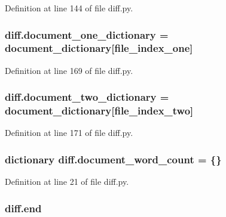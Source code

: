 Definition at line 144 of file diff.\+py.

\subsubsection[{\texorpdfstring{document\+\_\+one\+\_\+dictionary}{document_one_dictionary}}]{\setlength{\rightskip}{0pt plus 5cm}diff.\+document\+\_\+one\+\_\+dictionary = {\bf document\+\_\+dictionary}\mbox{[}{\bf file\+\_\+index\+\_\+one}\mbox{]}}\hypertarget{namespacediff_aa4da046a613de2dafe03d105bca31694}{}\label{namespacediff_aa4da046a613de2dafe03d105bca31694}


Definition at line 169 of file diff.\+py.

\subsubsection[{\texorpdfstring{document\+\_\+two\+\_\+dictionary}{document_two_dictionary}}]{\setlength{\rightskip}{0pt plus 5cm}diff.\+document\+\_\+two\+\_\+dictionary = {\bf document\+\_\+dictionary}\mbox{[}file\+\_\+index\+\_\+two\mbox{]}}\hypertarget{namespacediff_a00ac707250a54a82a970c2bb2acf736a}{}\label{namespacediff_a00ac707250a54a82a970c2bb2acf736a}


Definition at line 171 of file diff.\+py.

\subsubsection[{\texorpdfstring{document\+\_\+word\+\_\+count}{document_word_count}}]{\setlength{\rightskip}{0pt plus 5cm}dictionary diff.\+document\+\_\+word\+\_\+count = \{\}}\hypertarget{namespacediff_af16edaaafe4787892cb925870fd0d108}{}\label{namespacediff_af16edaaafe4787892cb925870fd0d108}


Definition at line 21 of file diff.\+py.

\subsubsection[{\texorpdfstring{end}{end}}]{\setlength{\rightskip}{0pt plus 5cm}diff.\+end}\hypertarget{namespacediff_a2839fdf2e0df35c347f0649098c5ecdc}{}\label{namespacediff_a2839fdf2e0df35c347f0649098c5ecdc}


